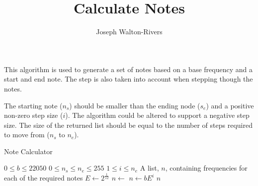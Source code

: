 \documentclass{../fal_assignment}
\title{Calculate Notes}
\author{Joseph Walton-Rivers}
\begin{document}
\maketitle

This algorithm is used to generate a set of notes based on a base frequency and a start and end note. The step is also taken into account when stepping though the notes.

The starting note ($n_s$) should be smaller than the ending node ($s_e$) and a positive non-zero step size ($i$). The algorithm could be altered to support a negative step size. The size of the returned list should be equal to the number of steps required to move from ($n_s$ to $n_e$).

\begin{algorithm}[ht]
	\caption{Note Calculator}
	\label{alg:algorithm}
	
	\begin{algorithmic}[1]
		\Require
		\Statex $0 \le b \le 22050$ 
		\Statex $0 \le n_s \le n_e \le 255$ 
		\Statex $1 \le i \le n_e$ 
		\Ensure
		\Statex A list, $n$, containing frequencies for each of the required notes
		\State $E\gets 2^{\frac{1}{12}}$
		\State $n\gets$ 
		\State $n\gets b E^i$
		\EndFor
		\State \Return $n$
		\EndFunction
	\end{algorithmic}
\end{algorithm}
\end{document}
